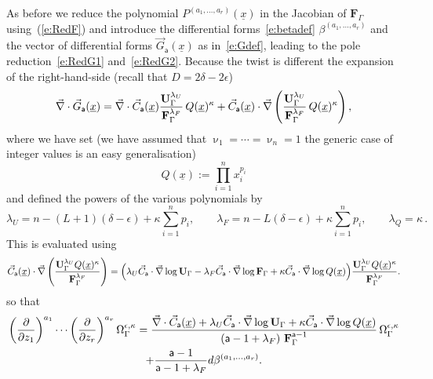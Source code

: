 \documentclass[a4paper,12pt]{article}
\numberwithin{equation}{section}
\numberwithin{figure}{section}
\begin{document}
As before we reduce the  polynomial
$P^{(a_1,\dots,a_r)}(\underline x)$ in the Jacobian of
$\textbf{F}_\Gamma$ using~(\ref{e:RedF}) and introduce the
differential forms~\eqref{e:betadef}
$\beta^{(a_1,\dots,a_r)}$  and the vector of differential forms $\vec
G_{\mathsf{a}}(\underline x)$ as in~\eqref{e:Gdef}, leading to the
pole reduction~\eqref{e:RedG1} and~\eqref{e:RedG2}.
Because the twist is different the expansion of the 
right-hand-side  (recall that $D=2\delta-2\epsilon$)
\begin{equation}
  \vec\nabla \cdot \vec G_{\mathsf{a}}(\underline x)=  \vec\nabla \cdot \vec C_{\mathsf{a}}(\underline x) { \textbf{U}_\Gamma ^{\lambda_U}  \over \textbf{F}_\Gamma ^{\lambda_F} }\,
  Q(\underline x)^\kappa
+
  \vec C_{\mathsf{a}}(\underline x) \cdot\vec\nabla  \left({ \textbf{U}_\Gamma ^{\lambda_U}  \over \textbf{F}_\Gamma ^{\lambda_F} }\,
  Q(\underline x)^\kappa \right) ,
\end{equation}
where we have set (we have assumed that $\upnu_1=\cdots=\upnu_n=1$ the
generic case of integer values is an easy generalisation)
\begin{equation}
  Q(\underline x):=\prod_{i=1}^n x_i^{p_i}   
\end{equation}
and defined the powers of the various polynomials by
\begin{equation}
  \label{e:powerUFQDef}
  \lambda_U= n-(L+1)(\delta-\epsilon)+\kappa\sum_{i=1}^n p_i, \qquad
  \lambda_F= n-L(\delta-\epsilon)+\kappa\sum_{i=1}^n p_i, \qquad
  \lambda_Q  = \kappa\,.
\end{equation}
%
This is  evaluated using 
\begin{equation}
  \vec C_{\mathsf{a}}(\underline x)\cdot \vec\nabla
  \left(\mathbf{U}_\Gamma^{\lambda_U}Q(\underline x)^\kappa\over
\mathbf{F}_\Gamma^{\lambda_F}\right)=\Big(\lambda_U \vec
C_{\mathsf{a}}\cdot \vec\nabla \log\mathbf{U}_\Gamma -\lambda_F \vec
C_{\mathsf{a}}\cdot \vec\nabla \log \mathbf{F}_\Gamma+\kappa \vec
C_{\mathsf{a}}\cdot\vec\nabla \log Q(\underline                             x)\Big)
                            {\mathbf{U}_\Gamma^{\lambda_U}Q(\underline x)^\kappa\over
\mathbf{F}_\Gamma^{\lambda_F}} .
\end{equation}
so that
\begin{multline}
	\label{e:PredAnReg}
\left(\partial\over \partial z_1\right)^{a_1}\cdots\left(\partial
  \over\partial z_r\right)^{a_r} \Omega_\Gamma^{\epsilon,\kappa}={
\vec\nabla \cdot \vec C_{\mathsf{a}}
     (\underline x)
+  \lambda_U \vec
    C_{\mathsf{a}}\cdot\vec\nabla\log\mathbf{U}_\Gamma+\kappa \vec
    C_{\mathsf{a}}\cdot\vec\nabla\log Q(\underline x)\over
    \left(\mathsf{a}-1+\lambda_F\right)\,\textbf{F}_\Gamma^{\mathsf{a}-1}}\,
  \Omega_\Gamma^{\epsilon,\kappa}\cr
+{  \mathsf{a}-1 \over \mathsf{a}-1+\lambda_F} d\beta^{(a_1,\dots,a_r)}.
\end{multline}
\end{document}
